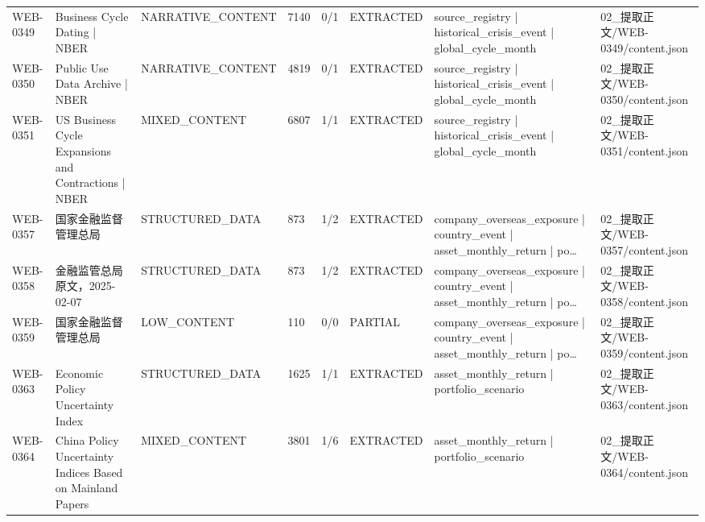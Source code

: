 \begin{landscape}
\begin{longtable}{p{1.8cm}p{4.2cm}p{3.0cm}p{1.4cm}p{1.6cm}p{2.4cm}p{4.2cm}p{4.2cm}}
WEB-0349 & Business Cycle Dating | NBER & NARRATIVE\_\allowbreak{}CONTENT & 7140 & 0/\allowbreak{}1 & EXTRACTED & source\_\allowbreak{}registry | historical\_\allowbreak{}crisis\_\allowbreak{}event | global\_\allowbreak{}cycle\_\allowbreak{}month & 02\_\allowbreak{}提取正文/\allowbreak{}WEB-0349/\allowbreak{}content.json\\
WEB-0350 & Public Use Data Archive | NBER & NARRATIVE\_\allowbreak{}CONTENT & 4819 & 0/\allowbreak{}1 & EXTRACTED & source\_\allowbreak{}registry | historical\_\allowbreak{}crisis\_\allowbreak{}event | global\_\allowbreak{}cycle\_\allowbreak{}month & 02\_\allowbreak{}提取正文/\allowbreak{}WEB-0350/\allowbreak{}content.json\\
WEB-0351 & US Business Cycle Expansions and Contractions | NBER & MIXED\_\allowbreak{}CONTENT & 6807 & 1/\allowbreak{}1 & EXTRACTED & source\_\allowbreak{}registry | historical\_\allowbreak{}crisis\_\allowbreak{}event | global\_\allowbreak{}cycle\_\allowbreak{}month & 02\_\allowbreak{}提取正文/\allowbreak{}WEB-0351/\allowbreak{}content.json\\
WEB-0357 & 国家金融监督管理总局 & STRUCTURED\_\allowbreak{}DATA & 873 & 1/\allowbreak{}2 & EXTRACTED & company\_\allowbreak{}overseas\_\allowbreak{}exposure | country\_\allowbreak{}event | asset\_\allowbreak{}monthly\_\allowbreak{}return | po… & 02\_\allowbreak{}提取正文/\allowbreak{}WEB-0357/\allowbreak{}content.json\\
WEB-0358 & 金融监管总局原文，2025-02-07 & STRUCTURED\_\allowbreak{}DATA & 873 & 1/\allowbreak{}2 & EXTRACTED & company\_\allowbreak{}overseas\_\allowbreak{}exposure | country\_\allowbreak{}event | asset\_\allowbreak{}monthly\_\allowbreak{}return | po… & 02\_\allowbreak{}提取正文/\allowbreak{}WEB-0358/\allowbreak{}content.json\\
WEB-0359 & 国家金融监督管理总局 & LOW\_\allowbreak{}CONTENT & 110 & 0/\allowbreak{}0 & PARTIAL & company\_\allowbreak{}overseas\_\allowbreak{}exposure | country\_\allowbreak{}event | asset\_\allowbreak{}monthly\_\allowbreak{}return | po… & 02\_\allowbreak{}提取正文/\allowbreak{}WEB-0359/\allowbreak{}content.json\\
WEB-0363 & Economic Policy Uncertainty Index & STRUCTURED\_\allowbreak{}DATA & 1625 & 1/\allowbreak{}1 & EXTRACTED & asset\_\allowbreak{}monthly\_\allowbreak{}return | portfolio\_\allowbreak{}scenario & 02\_\allowbreak{}提取正文/\allowbreak{}WEB-0363/\allowbreak{}content.json\\
WEB-0364 & China Policy Uncertainty Indices Based on Mainland Papers & MIXED\_\allowbreak{}CONTENT & 3801 & 1/\allowbreak{}6 & EXTRACTED & asset\_\allowbreak{}monthly\_\allowbreak{}return | portfolio\_\allowbreak{}scenario & 02\_\allowbreak{}提取正文/\allowbreak{}WEB-0364/\allowbreak{}content.json\\

\end{longtable}
\end{landscape}

